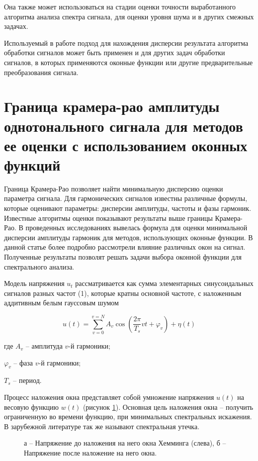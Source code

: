 Она также может использоваться на стадии оценки точности выработанного алгоритма анализа спектра сигнала, для оценки уровня шума и в других смежных задачах.

Используемый в работе подход для нахождения дисперсии результата алгоритма обработки сигналов может быть применен и для других задач обработки сигналов, в которых применяются оконные функции или другие предварительные преобразования сигнала.

\section{Граница крамера-рао амплитуды однотонального сигнала для методов ее оценки с использованием оконных функций} \label{sec:ch2/sec6} %

Граница Крамера-Рао позволяет найти минимальную дисперсию оценки параметра сигнала. Для гармонических сигналов известны различные формулы, которые оценивают параметры: дисперсии амплитуды, частоты и фазы гармоник. Известные алгоритмы оценки показывают результаты выше границы Крамера-Рао. В проведенных исследованиях \cite{альтман2020граница} вывелась формула для оценки минимальной дисперсии амплитуды гармоник для методов, использующих оконные функции. В данной статье более подробно рассмотрели влияние различных окон на сигнал. Полученные результаты позволят решать задачи выбора оконной функции для спектрального анализа.

Модель напряжения $u_{t}$ рассматривается как сумма элементарных синусоидальных сигналов разных частот (1), которые кратны основной частоте, с наложенным аддитивным белым гауссовым шумом 

\begin{equation}
	\label{eq:equation13}
	u(t)=\sum_{v=0}^{v=N}A_{v}\cos \left( \frac{2 \pi}{T_{s}}vt + \varphi_{v} \right) + \eta(t)
\end{equation}

где $A_{v}$ -- амплитуда $v$-й гармоники;

$\varphi_{v}$ -- фаза $v$-й гармоники;

$T_{s}$ -- период.

Процесс наложения окна представляет собой умножение напряжения $u(t)$ на весовую функцию $w(t)$ (рисунок \ref{img:blending_process _and_Hamming_window}). Основная цель наложения окна -- получить ограниченную во времени функцию, при минимальных спектральных искажения. В зарубежной литературе так же называют спектральная утечка.
\begin{figure}[ht]
	\caption{а – Напряжение до наложения на него окна Хемминга (слева), б – Напряжение после наложение на него окна.}\label{img:blending_process _and_Hamming_window}
\end{figure}

